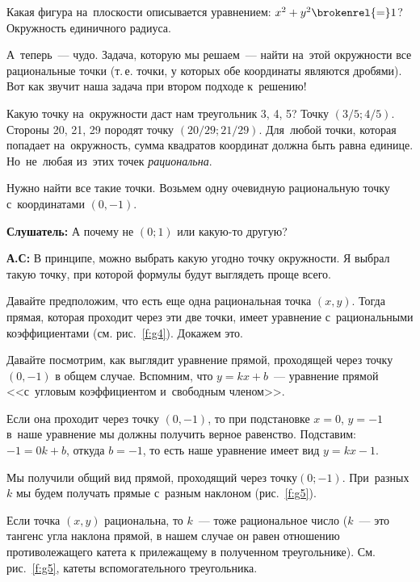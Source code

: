 Какая фигура на~плоскости описывается уравнением: $x^{2}+y^{2}\brokenrel{=}1$? Окружность единичного радиуса.

А~теперь~--- чудо. Задача, которую мы решаем~--- найти на~этой окружности все рациональные
точки (т.\,е. точки, у которых обе координаты являются дробями). Вот как звучит наша задача при втором подходе к~решению!


Какую точку на~окружности даст нам треугольник 3, 4, 5? Точку $(3/5; 4/5)$. Стороны 20, 21, 29
породят точку $(20/29; 21/29)$. Для~любой точки, которая попадает на~окружность, сумма квадратов
координат должна быть равна единице. Но~не~любая из~этих точек \textit{рациональна}.

Нужно найти все такие точки. Возьмем одну очевидную рациональную точку с~координатами $(0, -1)$.

\textbf{Слушатель:} А почему не $(0;1)$ или какую-то другую?

\textbf{А.С:} В принципе, можно выбрать какую угодно точку окружности. Я выбрал такую точку, при которой формулы будут выглядеть проще всего.

Давайте предположим, что есть еще одна рациональная точка $(x,y)$. Тогда прямая, которая проходит
через эти две точки, имеет уравнение с~рациональными коэффициентами
(см. рис.~\ref{f:g4}). Докажем это.

%
%


Давайте посмотрим, как выглядит уравнение прямой, проходящей через точку $(0,-1)$ в общем случае. Вспомним, что
$y=kx+b$~--- уравнение прямой <<с~угловым коэффициентом и~свободным членом>>.


Если она проходит через точку $(0,-1)$, то при подстановке $x=0$, $y=-1$ в~наше уравнение мы
должны получить верное равенство. Подставим: $-1=0k+b$, откуда $b=-1$, то есть наше уравнение имеет вид $y=kx-1$.


Мы получили общий вид прямой, проходящий через точку\linebreak $(0; -1)$. При~разных $k$ мы будем получать прямые
с~разным наклоном (рис.~\ref{f:g5}).


Если точка $(x,y)$ рациональна, то $k$~--- тоже рациональное число ($k$~--- это тангенс угла
наклона прямой, в нашем случае он равен отношению противолежащего катета к прилежащему в полученном
треугольнике). См. рис.~\ref{f:g5}, катеты вспомогательного треугольника.

